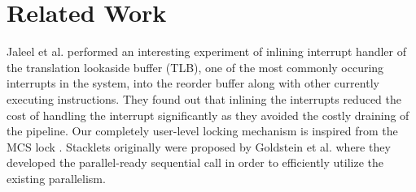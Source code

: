 \section{Related Work}
Jaleel et al. \cite{jaleel2006line} performed an interesting experiment of
inlining interrupt handler of the translation lookaside buffer (TLB), one of the
most commonly occuring interrupts in the system, into the reorder buffer along
with other currently executing instructions. They found out that inlining the
interrupts reduced the cost of handling the interrupt significantly as they
avoided the costly draining of the pipeline. Our completely user-level locking
mechanism is inspired from the MCS lock \cite{mellor1991synchronization}.
Stacklets originally were proposed by Goldstein et al. \cite{goldstein} where
they developed the parallel-ready sequential call in order to efficiently
utilize the existing parallelism.
